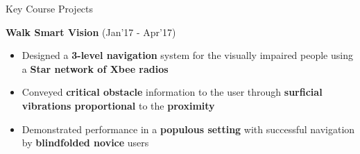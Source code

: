 \documentclass{resume}
\newcommand{\sepval}{-0.5em}
\begin{document}
\begin{rSection}{Key Course Projects}
\begin{itemize}[leftmargin=*]

\end{itemize}

% 
%
%  
%
%  	
%  	
% 

\vspace{-0.1cm}
\item {\bf Walk Smart Vision} \hfill {(Jan'17 - Apr'17)}\\
[-0.4cm]

\begin{itemize}[leftmargin=*]

	\itemsep \sepval

	
	\item Designed a {\bf 3-level navigation} system for the visually impaired people using a {\bf Star network of Xbee radios}
	
	\item Conveyed {\bf critical obstacle} information to the user through {\bf surficial vibrations proportional} to the {\bf proximity}
      
	\item Demonstrated performance in a {\bf populous setting} with successful navigation by {\bf blindfolded novice} users   
	
\end{itemize}


\end{rSection}
\end{document}
